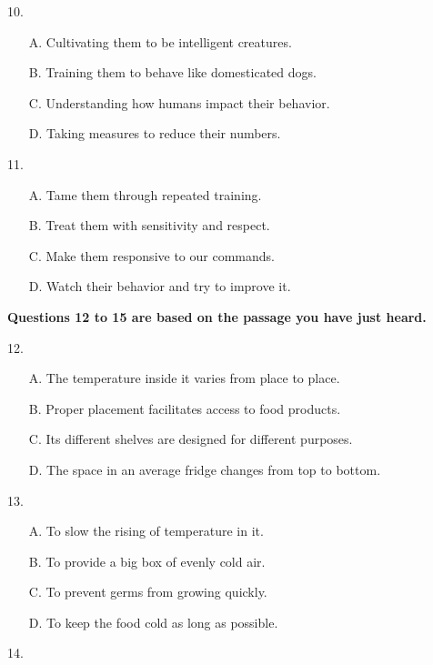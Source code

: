 \documentclass[UTF8,11pt]{ctexart}
\begin{document}
10.


\begin{itemize}[leftmargin=2em,itemsep=.2em,topsep=.4em]\item[A.] Cultivating them to be intelligent creatures.
\item[B.] Training them to behave like domesticated dogs.
\item[C.] Understanding how humans impact their behavior.
\item[D.] Taking measures to reduce their numbers.
\end{itemize}

11.


\begin{itemize}[leftmargin=2em,itemsep=.2em,topsep=.4em]\item[A.] Tame them through repeated training.
\item[B.] Treat them with sensitivity and respect.
\item[C.] Make them responsive to our commands.
\item[D.] Watch their behavior and try to improve it.
\end{itemize}

\textbf{Questions 12 to 15 are based on the passage you have just heard.}


12.


\begin{itemize}[leftmargin=2em,itemsep=.2em,topsep=.4em]\item[A.] The temperature inside it varies from place to place.
\item[B.] Proper placement facilitates access to food products.
\item[C.] Its different shelves are designed for different purposes.
\item[D.] The space in an average fridge changes from top to bottom.
\end{itemize}

13.


\begin{itemize}[leftmargin=2em,itemsep=.2em,topsep=.4em]\item[A.] To slow the rising of temperature in it.
\item[B.] To provide a big box of evenly cold air.
\item[C.] To prevent germs from growing quickly.
\item[D.] To keep the food cold as long as possible.
\end{itemize}

14.
\end{document}
